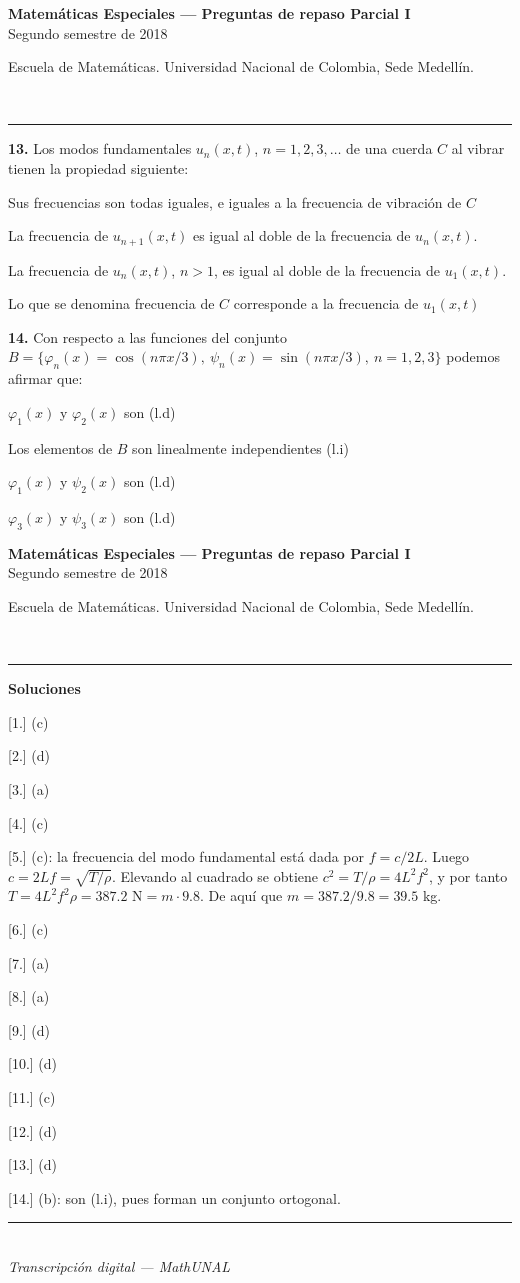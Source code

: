 \documentclass[11pt]{article}
\newcommand{\examheader}{%
  \noindent
  \begin{minipage}[t]{0.6\linewidth}
    {\small\bfseries Matem\'aticas Especiales --- Preguntas de repaso Parcial I}\\
    {\small Segundo semestre de 2018}
  \end{minipage}%
  \hfill
  \begin{minipage}[t]{0.35\linewidth}
    \raggedleft\small Escuela de Matem\'aticas. Universidad Nacional de Colombia, Sede Medell\'in.
  \end{minipage}\\[2pt]
  \rule{\linewidth}{0.6pt}
}
\newcommand{\examfooter}{%
  \vfill
  \rule{\linewidth}{0.4pt}\\[1pt]
  {\scriptsize\textit{Transcripci\'on digital --- MathUNAL}\hfill\textcolor{unalblue}{\textbf{\thepage}}}
}
\begin{document}
\clearpage
\examheader
\vspace{4pt}

\textbf{13.} Los modos fundamentales $u_n(x,t)$, $n=1,2,3,\ldots$ de una cuerda $C$ al vibrar tienen la propiedad siguiente:
\begin{opciones}
  \item Sus frecuencias son todas iguales, e iguales a la frecuencia de vibraci\'on de $C$
  \item La frecuencia de $u_{n+1}(x,t)$ es igual al doble de la frecuencia de $u_n(x,t)$.
  \item La frecuencia de $u_n(x,t)$, $n>1$, es igual al doble de la frecuencia de $u_1(x,t)$.
  \item Lo que se denomina frecuencia de $C$ corresponde a la frecuencia de $u_1(x,t)$
\end{opciones}

\vspace{6pt}
\textbf{14.} Con respecto a las funciones del conjunto $B = \{\varphi_n(x) = \cos(n\pi x/3),\ \psi_n(x) = \sin(n\pi x/3),\ n=1,2,3\}$ podemos afirmar que:
\begin{opciones}
  \item $\varphi_1(x)$ y $\varphi_2(x)$ son (l.d)
  \item Los elementos de $B$ son linealmente independientes (l.i)
  \item $\varphi_1(x)$ y $\psi_2(x)$ son (l.d)
  \item $\varphi_3(x)$ y $\psi_3(x)$ son (l.d)
\end{opciones}

\clearpage
\examheader
\vspace{4pt}
\begin{center}{\large\bfseries Soluciones}\end{center}
\vspace{6pt}

\begin{description}[itemsep=2pt, leftmargin=2.2em, font=\normalfont\bfseries]
  \item{}[1.] (c)
  \item{}[2.] (d)
  \item{}[3.] (a)
  \item{}[4.] (c)
  \item{}[5.] (c): la frecuencia del modo fundamental est\'a dada por $f = c/2L$. Luego $c = 2Lf = \sqrt{T/\rho}$. Elevando al cuadrado se obtiene $c^2 = T/\rho = 4L^2f^2$, y por tanto $T = 4L^2f^2\rho = 387.2\text{ N} = m\cdot 9.8$. De aqu\'i que $m = 387.2/9.8 = 39.5$ kg.
  \item{}[6.] (c)
  \item{}[7.] (a)
  \item{}[8.] (a)
  \item{}[9.] (d)
  \item{}[10.] (d)
  \item{}[11.] (c)
  \item{}[12.] (d)
  \item{}[13.] (d)
  \item{}[14.] (b): son (l.i), pues forman un conjunto ortogonal.
\end{description}

\examfooter
\end{document}
